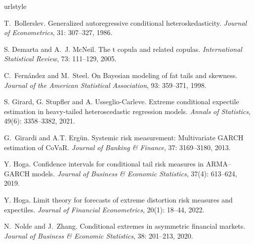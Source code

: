 \begin{thebibliography}{29}
\providecommand{\natexlab}[1]{#1}
\providecommand{\url}[1]{\texttt{#1}}
\expandafter\ifx\csname urlstyle\endcsname\relax
  \providecommand{\doi}[1]{doi: #1}\else
  \providecommand{\doi}{doi: \begingroup \urlstyle{rm}\Url}\fi
  
T.~Bollerslev.
\newblock Generalized autoregressive conditional heteroskedasticity.
\newblock \emph{Journal of Econometrics}, 31: 307--327, 1986.  
  

S. Demarta and A.~J. McNeil.
\newblock The t copula and related copulas.
\newblock \emph{International Statistical Review}, 73:
  111--129, 2005.

  
C.~Fern{\'a}ndez and M.~Steel.
\newblock On {B}ayesian modeling of fat tails and skewness.
\newblock \emph{Journal of the American Statistical Association}, 93:
  359--371, 1998.
  
S. Girard, G. Stupfler and A. Usseglio-Carleve.
\newblock Extreme conditional expectile estimation in heavy-tailed heteroscedastic regression models.
\newblock \emph{Annals of Statistics}, 49(6): 3358–3382, 2021.

    
  
G.~Girardi and A.T. Erg{\"u}n.
\newblock Systemic risk measurement: Multivariate {GARCH} estimation of
  {CoVaR}.
\newblock \emph{Journal of Banking \& Finance}, 37: 3169--3180, 2013.

Y. Hoga.
\newblock Confidence intervals for conditional tail risk measures in ARMA--GARCH models.
\newblock \emph{Journal of Business \& Economic Statistics}, 37(4): 613--624, 2019.

Y. Hoga.
\newblock Limit theory for forecasts of extreme distortion risk measures and expectiles.
\newblock \emph{Journal of Financial Econometrics}, 20(1): 18–44, 2022.


N.~Nolde and J.~Zhang.
\newblock Conditional extremes in asymmetric financial markets.
\newblock \emph{Journal of Business \& Economic Statistics}, 38: 201--213, 2020.

\end{thebibliography}

